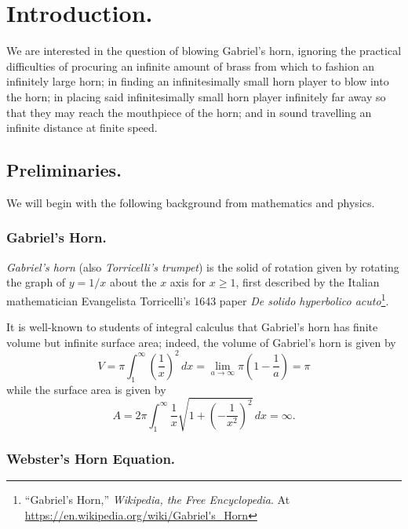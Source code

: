 

\rhead{\today}


    
\section{Introduction.}

We are interested in the question of blowing Gabriel's horn,
ignoring the practical difficulties of procuring an infinite amount
of brass from which to fashion an infinitely large horn; in finding an
infinitesimally small horn player to blow into the horn; in placing
said infinitesimally small horn player infinitely far away so that they may
reach the mouthpiece of the horn; and in sound travelling an infinite
distance at finite speed.

\subsection{Preliminaries.}

We will begin with the following background from mathematics and physics.

\subsubsection{Gabriel's Horn.}

\emph{Gabriel's horn} (also \emph{Torricelli's trumpet}) is the solid
of rotation given by rotating the graph of $y = 1/x$ about the
$x$ axis for $x \geq 1$, first described by the Italian mathematician
Evangelista Torricelli's 1643 paper \emph{De solido hyperbolico acuto}\footnote{``Gabriel's Horn,'' \emph{Wikipedia, the Free Encyclopedia}.
At \url{https://en.wikipedia.org/wiki/Gabriel's_Horn}}.

It is well-known to students of integral calculus that Gabriel's horn
has finite volume but infinite surface area; indeed, the volume of
Gabriel's horn is given by
\[
    V = \pi \int_1^\infty \left(\frac{1}{x}\right)^2 \,dx
    = \lim_{a \to \infty} \pi\left(1 - \frac{1}{a}\right)
    = \pi
\]
while the surface area is given by
\[
    A = 2\pi \int_1^\infty \frac{1}{x}\sqrt{1 + \left(-\frac{1}{x^2}\right)^2} \,dx
    = \infty.
\]

\subsubsection{Webster's Horn Equation.}

